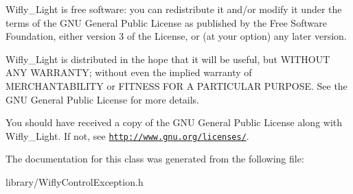 Wifly\-\_\-\-Light is free software\-: you can redistribute it and/or modify it under the terms of the G\-N\-U General Public License as published by the Free Software Foundation, either version 3 of the License, or (at your option) any later version.

Wifly\-\_\-\-Light is distributed in the hope that it will be useful, but W\-I\-T\-H\-O\-U\-T A\-N\-Y W\-A\-R\-R\-A\-N\-T\-Y; without even the implied warranty of M\-E\-R\-C\-H\-A\-N\-T\-A\-B\-I\-L\-I\-T\-Y or F\-I\-T\-N\-E\-S\-S F\-O\-R A P\-A\-R\-T\-I\-C\-U\-L\-A\-R P\-U\-R\-P\-O\-S\-E. See the G\-N\-U General Public License for more details.

You should have received a copy of the G\-N\-U General Public License along with Wifly\-\_\-\-Light. If not, see \href{http://www.gnu.org/licenses/}{\tt http\-://www.\-gnu.\-org/licenses/}. 

The documentation for this class was generated from the following file\-:\begin{DoxyCompactItemize}
\item 
library/Wifly\-Control\-Exception.\-h\end{DoxyCompactItemize}
